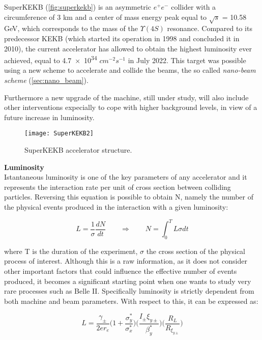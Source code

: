 SuperKEKB (\autoref{fig:superkekb}) is an asymmetric $e^{+}e^{-}$ collider with a circumference of 3 km and a center of mass energy peak equal to  $\sqrt{s}$ = 10.58 GeV, which corresponds to the mass of the $\Upsilon(4S)$ resonance.
Compared to its predecessor KEKB (which started its operation in 1998 and concluded it in 2010), the current accelerator has allowed to obtain the highest luminosity ever achieved, equal to \num{4.7e34} $cm^{-2}s^{-1}$ in July 2022. This target was possible using a new scheme to accelerate and collide the beams, the so called \textit{nano-beam scheme} (\autoref{sec:nano_beam}). 

Furthermore a new upgrade of the machine, still under study, will also include other interventions expecially to cope with higher background levels, in view of a future increase in luminosity.

\begin{figure}[h!]
\centering
\texttt{[image: SuperKEKB2]}
\caption{SuperKEKB accelerator structure.}
\label{fig:superkekb}
\end{figure}


\bigskip

\textbf{Luminosity}\\

Istantaneous luminosity is one of the key parameters of any accelerator and it represents the interaction rate per unit of cross section between colliding particles. Reversing this equation is possible to obtain N, namely the number of the physical events produced in the interaction with a given luminosity:

\begin{equation}
L =\frac{1}{\sigma}\frac{dN}{dt}  \qquad   \Rightarrow \qquad  N = \int_{0}^{T} L\sigma dt
\end{equation}

where T is the duration of the experiment,  $\sigma$ the cross section of the physical process of interest. Although this is a raw information, as it does not consider other important factors that could influence the effective number of events produced, it becomes a significant starting point when one wants to study very rare processes such as Belle II.
Specifically luminosity is strictly dependent from both machine and beam parameters. With respect to this, it can be expressed as:

\begin{equation} \label{eq:luminosity_eq}
L = \frac{\gamma_{\pm}}{2er_{e}} \bigg(1 + \frac{\sigma_{y}^{*}}{\sigma_{x}^{*}} \bigg) \bigg(\frac{I_{\pm}\xi_{y\pm}}{\beta^{*}_{y}} \bigg) \bigg(\frac{R_{L}}{R_{\xi_{y\pm}}} \bigg)
\end{equation}

